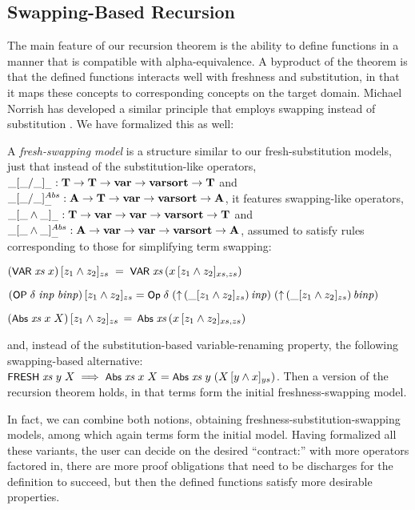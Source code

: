 \subsection{Swapping-Based Recursion}

The main feature of our recursion theorem is the ability to define 
functions in a manner that is compatible with alpha-equivalence. 
A byproduct of the theorem is that the defined functions  
interacts well with freshness and substitution, in that 
it maps these concepts to corresponding concepts on the target domain.  
Michael Norrish has developed a similar principle that employs swapping instead 
of substitution \cite{norrish-MechanisingLambdaInFirstOrder}. We have formalized this 
as well:

A {\em fresh-swapping model} is a structure similar to our fresh-substitution models, 
just that instead of the substitution-like operators, $\_[\_/\_]_\_ : \bf T \rightarrow \bf T \rightarrow \mbox{\bf var} \rightarrow \mbox{\bf varsort} \rightarrow \bf T$ and 
$\_[\_/\_]_\_^{Abs} : \bf A \rightarrow \bf T \rightarrow \mbox{\bf var} \rightarrow \mbox{\bf varsort} \rightarrow \bf A$, 
it features swapping-like operators, 
$\_[\_\wedge\_]_\_ : \bf T \rightarrow \mbox{\bf var} \rightarrow \mbox{\bf var} \rightarrow \mbox{\bf varsort} \rightarrow \bf T$ and 
$\_[\_\wedge \_]_\_^{Abs} : \bf A \rightarrow \mbox{\bf var} \rightarrow \mbox{\bf var} \rightarrow \mbox{\bf varsort} \rightarrow \bf A$, assumed to 
satisfy rules corresponding to those for simplifying term swapping: 
%
\begin{myitem}
\item $(\mbox{{\rm \textsf{\small V$\hspace*{-0.1ex}$A$\hspace*{-0.1ex}$R}}}\;\mbox{\textit{xs}}\;x)\,[z_1 \wedge z_2]_{zs} \;=\; \mbox{{\rm \textsf{\small V$\hspace*{-0.1ex}$A$\hspace*{-0.1ex}$R}}}\;\mbox{\textit{xs}}\,(x\,[z_1 \wedge z_2]_{xs,zs})$
%
\item $(\mbox{\rm\textsf{\small OP}}\;\delta\;\mbox{\textit{inp}}\;\mbox{\textit{binp}})\,[z_1 \wedge z_2]_{zs} = 
\mbox{\rm\textsf{\small Op}}\;\delta\;(\mbox{$\uparrow$}\,(\_[z_1 \wedge z_2]_{zs})\,\mbox{\textit{inp}})\;(\mbox{$\uparrow$}\,(\_[z_1 \wedge z_2]_{zs})\,\mbox{\textit{binp}})$ 
%
%
\item $(\mbox{\rm\textsf{\small Abs}}\;\mbox{\textit{xs}}\;x\;X)\,[z_1 \wedge z_2]_{zs} \,=\, \mbox{\rm\textsf{\small Abs}}\;\mbox{\textit{xs}}\,(x\,[z_1 \wedge z_2]_{xs,zs})$
\end{myitem}
%
and, instead of the substitution-based variable-renaming property, the following 
swapping-based alternative: $\mbox{\rm\textsf{\small FRESH}}\;\mbox{\textit{xs}}\;y\;X \;\Longrightarrow\; \mbox{\rm\textsf{\small Abs}}\;\mbox{\textit{xs}}\;x\;X = \mbox{\rm\textsf{\small Abs}}\;\mbox{\textit{xs}}\;y\;(X\,[y \wedge x]_{ys})$. 
%
Then a version of the recursion theorem holds, in that terms form the initial 
freshness-swapping model. 

In fact, we can combine both notions, obtaining 
freshness-substitution-swapping models, among which again terms form the initial 
model. Having formalized all these variants, the user can decide on the desired 
``contract:'' with more operators factored in, there are more proof obligations that 
need to be discharges for the definition to succeed, but then the 
defined functions satisfy more desirable properties. %


